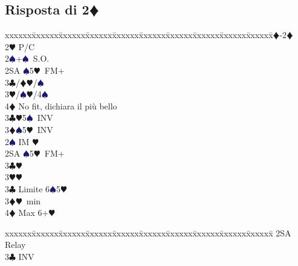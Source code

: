 \documentclass[a4paper,italian]{article}
\newcommand{\BC}{\textcolor{OliveGreen}{$\clubsuit$}}
\newcommand{\BD}{\textcolor{RedOrange}{$\vardiamondsuit$}}
\newcommand{\BH}{\textcolor{Red2}{$\varheartsuit${}}}
\newcommand{\BS}{\textcolor{MidnightBlue}{$\spadesuit${}}}
\newcommand{\pdfd}{\texorpdfstring{\BD{}}{D}}
\newenvironment{bidtable}
{\begin{tabbing}

    xxxxxx\=xxxxxx\=xxxxxx\=xxxxxx\=xxxxxx\=xxxxxx\=xxxxxx\=xxxxxx\=xxxxxx\=xxxxxx\=\kill}
{\end{tabbing} }%
\begin{document}
                                    \subsection{Risposta di 2\pdfd}
                                    \begin{multicols}{2}



                                        \begin{bidtable}
                                            1\BD-2\BD\+\\
                                            2\BH \> P/C\+\\
                                            2\BS {}+\BS\ S.O.\\
                                            2SA \BS 5\BH\ FM+\+\\
                                            3\BC/\BD {}\BH /\BS \\
                                            3\BH/\BS {}\BH /4\BS \\
                                            4\BD \> No fit, dichiara il più bello\-\\
                                            3\BC {}\BH 5\BS\ INV\\
                                            3\BD {}\BS 5\BH\ INV\-\\
                                            2\BS \> IM \BH \+\\
                                            2SA \BS 5\BH\ FM+\+\\
                                            3\BC {}\BH \\
                                            3\BH {}\BH \-\\
                                            3\BC \> Limite 6\BS 5\BH \\
                                            3\BD {}\BH\ min\\
                                            4\BD \> Max 6+\BH \-\\
                                        \end{bidtable}
                                        \columnbreak
                                        \begin{bidtable}
                                            2SA \> Relay\+\\
                                            3\BC {} INV\+\\

\end{bidtable}
\end{multicols}
\end{document}

